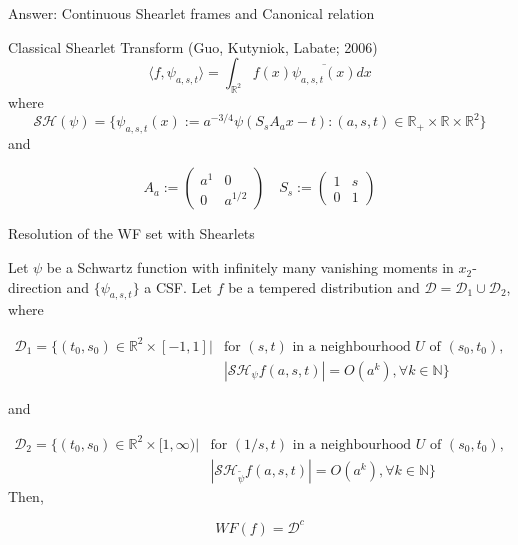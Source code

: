 \begin{frame}{Answer: Continuous Shearlet frames and Canonical relation}
\begin{block}{Classical Shearlet Transform (Guo, Kutyniok, Labate; 2006)}
$$
\langle f,\psi_{a,s,t}\rangle =\int_{\mathbb{R}^2}f(x)\overline{\psi_{a,s,t}(x)}dx
$$
where
$$
\mathcal{SH}(\psi)=\{\psi_{a,s,t}(x):=a^{-3/4}\psi (S_sA_ax-t):(a,s,t)\in \mathbb{R}_+\times\mathbb{R}\times\mathbb{R}^2\}
$$
and

$$
A_a:=
\left(
\begin{matrix}
a^1 & 0 \\
0 & a^{1/2}
\end{matrix}
\right)
\quad
S_s:=
\left(
\begin{matrix}
1 & s \\
0 & 1
\end{matrix}
\right)
$$
\end{block}
\end{frame}

\begin{frame}{Resolution of the WF set with Shearlets}

\begin{theorem}[Grohs, 2011] 
\label{thm:Resolution2}
Let $\psi$ be a Schwartz function with infinitely many vanishing moments in $x_2$-direction and $\{\psi_{a,s,t}\}$ a CSF\@. Let $f$ be a tempered distribution and $\mathcal{D}=\mathcal{D}_1\cup\mathcal{D}_2$, where

$$
\begin{aligned}
\mathcal{D}_1=\{ (t_0,s_0)\in\mathbb{R}^2\times [-1,1]|& \text{for $(s,t)$ in a neighbourhood $U$ of $(s_0,t_0)$},\\
&|\mathcal{SH}_{\psi}f(a,s,t)|=O(a^k),\forall k\in\mathbb{N} \}
\end{aligned}
$$

and

$$
\begin{aligned}
\mathcal{D}_2=\{ (t_0,s_0)\in\mathbb{R}^2\times [1,\infty)|& \text{for $(1/s,t)$ in a neighbourhood $U$ of $(s_0,t_0)$},\\
&|\mathcal{SH}_{\tilde{\psi}}f(a,s,t)|=O(a^k), \forall k\in \mathbb{N} \}
\end{aligned}
$$
Then,

$$
WF(f)=\mathcal{D}^c
$$
\end{theorem}
\end{frame}

